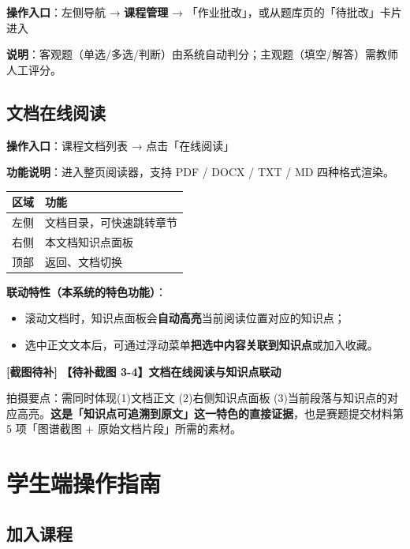 \documentclass[UTF8,a4paper,11pt]{ctexrep}
\newcommand{\shotmark}{\textcolor{todobar}{\textbf{[截图待补]}}}
\begin{document}
\textbf{操作入口}：左侧导航 → \textbf{课程管理} → 「作业批改」，或从题库页的「待批改」卡片进入

\textbf{说明}：客观题（单选/多选/判断）由系统自动判分；主观题（填空/解答）需教师人工评分。


\subsection{文档在线阅读}

\textbf{操作入口}：课程文档列表 → 点击「在线阅读」

\textbf{功能说明}：进入整页阅读器，支持 PDF / DOCX / TXT / MD 四种格式渲染。

\begin{center}
\small
\begin{tabularx}{\linewidth}{@{}XX@{}}
\toprule
区域 & 功能 \\
\midrule
左侧 & 文档目录，可快速跳转章节 \\
右侧 & 本文档知识点面板 \\
顶部 & 返回、文档切换 \\
\bottomrule
\end{tabularx}
\end{center}
\textbf{联动特性（本系统的特色功能）}：

\begin{itemize}
\item 滚动文档时，知识点面板会\textbf{自动高亮}当前阅读位置对应的知识点；
\item 选中正文文本后，可通过浮动菜单\textbf{把选中内容关联到知识点}或加入收藏。
\end{itemize}
\begin{todobox}
\shotmark{} \textbf{【待补截图 3-4】文档在线阅读与知识点联动}

拍摄要点：需同时体现(1)文档正文 (2)右侧知识点面板 (3)当前段落与知识点的对应高亮。\textbf{这是「知识点可追溯到原文」这一特色的直接证据}，也是赛题提交材料第 5 项「图谱截图 + 原始文档片段」所需的素材。

\end{todobox}


\section{学生端操作指南}


\subsection{加入课程}
\end{document}
